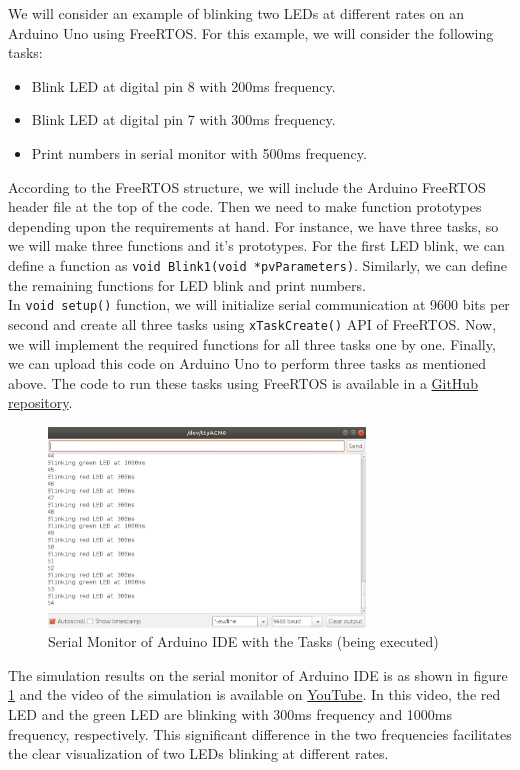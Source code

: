 \documentclass[12pt]{report}
\begin{document}
We will consider an example of blinking two LEDs at different rates on an Arduino Uno using FreeRTOS. For this example, we will consider the following tasks:
\begin{itemize}
    \setlength\itemsep{-0.2em}
    \item Blink LED at digital pin 8 with 200ms frequency.
    \item Blink LED at digital pin 7 with 300ms frequency.
    \item Print numbers in serial monitor with 500ms frequency. 
\end{itemize}

According to the FreeRTOS structure, we will include the Arduino FreeRTOS header file at the top of the code. Then we need to make function prototypes depending upon the requirements at hand. For instance, we have three tasks, so we will make three functions and it's prototypes. For the first LED blink, we can define a function as \texttt{void Blink1(void *pvParameters)}. Similarly, we can define the remaining functions for LED blink and print numbers. \\

In \texttt{void setup()} function, we will initialize serial communication at 9600 bits per second and create all three tasks using \texttt{xTaskCreate()} API of FreeRTOS. Now, we will implement the required functions for all three tasks one by one. Finally, we can upload this code on Arduino Uno to perform three tasks as mentioned above. The code to run these tasks using FreeRTOS is available in a \href{https://github.com/SudhakarKuma/MTech_Seminar_June_2020/tree/master/FreeRTOS_Arduino_codes}{GitHub repository}. 
\begin{figure}[h]
\centering
\includegraphics[width=0.75\textwidth]{images/Arduino-ide-tasks.png}
\caption{Serial Monitor of Arduino IDE with the Tasks (being executed)}
\label{fig:arduino-leds-serial-mon}
\end{figure}
The simulation results on the serial monitor of Arduino IDE is as shown in figure \ref{fig:arduino-leds-serial-mon} and the video of the simulation is available on \href{https://youtu.be/SBuHO7kwZ0Y}{YouTube}. In this video, the red LED and the green LED are blinking with 300ms frequency and 1000ms frequency, respectively. This significant difference in the two frequencies facilitates the clear visualization of two LEDs blinking at different rates.  
\end{document}
